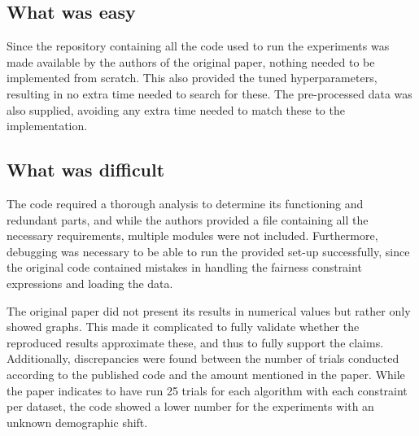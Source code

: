 \subsection{What was easy}
Since the repository containing all the code used to run the experiments was made available by the authors of the original paper, nothing needed to be implemented from scratch. This also provided the tuned hyperparameters, resulting in no extra time needed to search for these. The pre-processed data was also supplied, avoiding any extra time needed to match these to the implementation. 

\subsection{What was difficult}
The code required a thorough analysis to determine its functioning and redundant parts, and while the authors provided a file containing all the necessary requirements, multiple modules were not included. Furthermore, debugging was necessary to be able to run the provided set-up successfully, since the original code contained mistakes in handling the fairness constraint expressions and loading the data. 

The original paper did not present its results in numerical values but rather only showed graphs. This made it complicated to fully validate whether the reproduced results approximate these, and thus to fully support the claims. Additionally, discrepancies were found between the number of trials conducted according to the published code and the amount mentioned in the paper. While the paper indicates to have run 25 trials for each algorithm with each constraint per dataset, the code showed a lower number for the experiments with an unknown demographic shift. 


